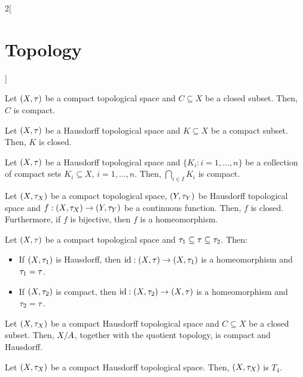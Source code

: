 \documentclass[../../../main.tex]{subfiles}
\begin{document}
\begin{multicols}{2}[\section{Topology}]
\begin{theorem}
    \end{theorem}
    \begin{theorem}
        Let $(X,\tau)$ be a compact topological space and $C\subseteq X$ be a closed subset. Then, $C$ is compact.
    \end{theorem}
    \begin{theorem}
        Let $(X,\tau)$ be a Hausdorff topological space and $K\subseteq X$ be a compact subset. Then, $K$ is closed.
    \end{theorem}
    \begin{corollary}
        Let $(X,\tau)$ be a Hausdorff topological space and $\{K_i:i=1,\ldots,n\}$ be a collection of compact sets $K_i\subseteq X$, $i=1,\ldots,n$. Then, $\bigcap_{i\in I}K_i$ is compact.
    \end{corollary}
    \begin{corollary}
        Let $(X,\tau_X)$ be a compact topological space, $(Y,\tau_Y)$ be Hausdorff topological space and $f:(X,\tau_X)\rightarrow(Y,\tau_Y)$ be a continuous function. Then, $f$ is closed. Furthermore, if $f$ is bijective, then $f$ is a homeomorphism.
    \end{corollary}
    \begin{corollary}
        Let $(X,\tau)$ be a compact topological space and $\tau_1\subseteq\tau\subseteq\tau_2$. Then:
        \begin{itemize}
            \item If $(X,\tau_1)$ is Hausdorff, then $\mathrm{id}:(X,\tau)\rightarrow(X,\tau_1)$ is a homeomorphism and $\tau_1=\tau$.
            \item If $(X,\tau_2)$ is compact, then $\mathrm{id}:(X,\tau_2)\rightarrow(X,\tau)$ is a homeomorphism and $\tau_2=\tau$.
        \end{itemize}
    \end{corollary}
    \begin{prop}
        Let $(X,\tau_X)$ be a compact Hausdorff topological space and $C\subseteq X$ be a closed subset. Then, $\quot{X}{A}$, together with the quotient topology, is compact and Hausdorff.
    \end{prop}
    \begin{prop}
        Let $(X,\tau_X)$ be a compact Hausdorff topological space. Then, $(X,\tau_X)$ is $T_4$.
    \end{prop}

\end{multicols}
\end{document}
